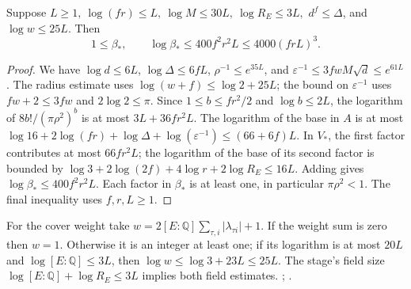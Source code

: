 \begin{corollary}\label{bergvol:size}
Suppose \(L\ge1,\ \log(fr)\le L,\ \log M\le30L,\ \log R_E\le3L,\)
\(d^f\le\Delta\), and \(\log w\le25L\). Then
\[
  1\le\beta_*,\qquad \log\beta_*\le 400 f^2 r^2 L
          \le4000(frL)^3 .
\]
\end{corollary}
\begin{proof}
We have \(\log d\le6L\), \(\log\Delta\le6fL\),
\(\rho^{-1}\le e^{35L}\), and \(\varepsilon^{-1}\le
3fwM\sqrt d\le e^{61L}\). The radius estimate uses
\(\log(w+f)\le\log2+25L\); the bound on \(\varepsilon^{-1}\)
uses \(fw+2\le3fw\) and \(2\log2\le\pi\).
Since \(1\le b\le fr^2/2\) and \(\log b\le2L\), the logarithm
of \(8b!/(\pi\rho^2)^b\) is at most \(3L+36fr^2L\).
The logarithm of the base in \(A\) is at most
\(\log16+2\log(fr)+\log\Delta+\log(\varepsilon^{-1})
\le(66+6f)L\).
In \(V_*\), the first factor contributes at most \(66fr^2L\);
the logarithm of the base of its second factor is bounded by
\(\log3+2\log(2f)+4\log r+2\log R_E\le16L\).
Adding gives \(\log\beta_*\le400 f^2r^2L\). Each factor in
\(\beta_*\) is at least one, in particular \(\pi\rho^2<1\).
The final inequality uses \(f,r,L\ge1\).
\end{proof}
For the cover weight take \(w=2[E:\mathbb Q]\sum_{\tau,i}
|\lambda_{\tau i}|+1\). If the weight sum is zero then \(w=1\).
Otherwise it is an integer at least one; if its logarithm is at
most \(20L\) and \(\log[E:\mathbb Q]\le3L\), then
\(\log w\le\log3+23L\le25L\). The stage's field size
\(\log[E:\mathbb Q]+\log R_E\le3L\) implies both field estimates.
;
.

